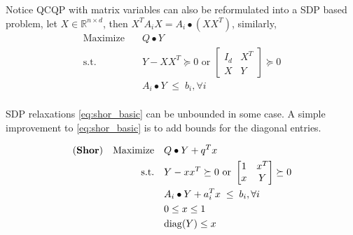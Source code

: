 \documentclass[../main]{subfiles}
\begin{document}
Notice QCQP with matrix variables can also be reformulated into a SDP based problem, let \(X \in \mathbb{R}^{n\times d}\), then \(X^{T} A_{i} X = A_i \bullet (XX^T)\), similarly,
\begin{equation}
  \begin{aligned}
    \mathrm{Maximize}\quad & Q\bullet Y                                                       \\
    \mathrm{s.t.}  \quad   & Y-XX^T \succeq 0 \text { or }\begin{bmatrix} I_d & X^{T} \\ X & Y \end{bmatrix} \succeq 0 \\
                           & A_i \bullet Y \; \le  \; b_i, \forall i                          \\
  \end{aligned}
\end{equation}

SDP relaxations \eqref{eq:shor_basic} can be unbounded in some case. A simple improvement to \eqref{eq:shor_basic} is to add bounds for the diagonal entries.

\begin{equation}\label{eq:shor}
  \begin{aligned}
    (\textbf{Shor}) \quad\mathrm{Maximize}\quad & Q\bullet Y   + q^T x                                             \\
    \mathrm{s.t.}  \quad                     & Y-xx^T \succeq 0 \text { or }\begin{bmatrix} 1 & x^{T} \\ x & Y \end{bmatrix} \succeq 0 \\
                                             & A_i \bullet Y + a_i^Tx \; \le  \; b_i, \forall i                 \\
                                             & 0\le x\le 1                                                      \\
                                             & \mathrm{diag}(Y) \le x
  \end{aligned}
\end{equation}
\end{document}
